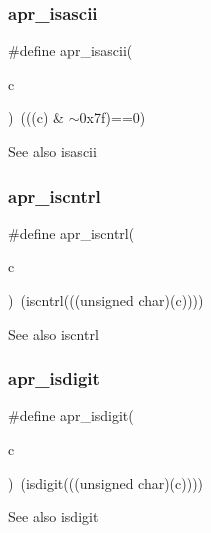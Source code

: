 \subsubsection{\texorpdfstring{apr\+\_\+isascii}{apr\_isascii}}
{\footnotesize\ttfamily \#define apr\+\_\+isascii(\begin{DoxyParamCaption}\item[{}]{c }\end{DoxyParamCaption})~(((c) \& $\sim$0x7f)==0)}

\begin{DoxySeeAlso}{See also}
isascii 
\end{DoxySeeAlso}
\mbox{\label{group__apr__ctype_gacc8b4597be99c895ea042e8088ee94ab}} 
\subsubsection{\texorpdfstring{apr\+\_\+iscntrl}{apr\_iscntrl}}
{\footnotesize\ttfamily \#define apr\+\_\+iscntrl(\begin{DoxyParamCaption}\item[{}]{c }\end{DoxyParamCaption})~(iscntrl(((unsigned char)(c))))}

\begin{DoxySeeAlso}{See also}
iscntrl 
\end{DoxySeeAlso}
\mbox{\label{group__apr__ctype_ga8c453b1d66015b357c3d3a3ddb7d97d7}} 
\subsubsection{\texorpdfstring{apr\+\_\+isdigit}{apr\_isdigit}}
{\footnotesize\ttfamily \#define apr\+\_\+isdigit(\begin{DoxyParamCaption}\item[{}]{c }\end{DoxyParamCaption})~(isdigit(((unsigned char)(c))))}

\begin{DoxySeeAlso}{See also}
isdigit 
\end{DoxySeeAlso}
\mbox{\label{group__apr__ctype_gad4fbfcf508e7771ca85e85e4ac9567c2}} 
